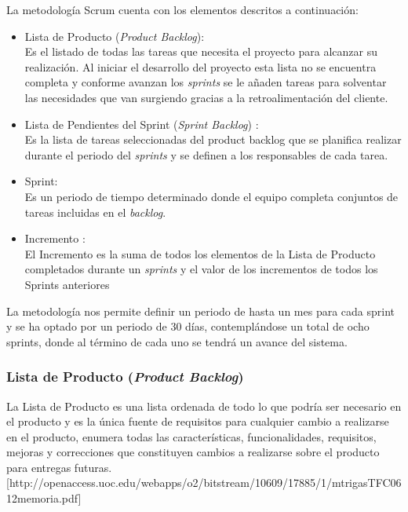 \noindent La metodología Scrum cuenta con los elementos descritos a continuación: 

\begin{itemize}
	\item Lista de Producto (\textit{Product Backlog}):\\
	Es el listado de todas las tareas que necesita el proyecto para alcanzar su realización. Al iniciar el desarrollo del
	proyecto esta lista no se encuentra completa y conforme avanzan los \textit{sprints} se le añaden tareas para solventar las necesidades que	van surgiendo gracias a la retroalimentación del cliente.
	\item Lista de Pendientes del Sprint (\textit{Sprint Backlog}) : \\
	Es la lista de tareas seleccionadas del product backlog que se planifica realizar durante el periodo del \textit{sprints} y se definen a los responsables de cada tarea.
	\item Sprint:\\
	Es un periodo de tiempo determinado donde el equipo completa conjuntos de tareas incluidas en el \textit{backlog}.
	\item Incremento : \\
	El Incremento es la suma de todos los elementos de la Lista de Producto completados durante un \textit{sprints} y el valor de los incrementos de todos los Sprints anteriores
\end{itemize}

La metodología nos permite definir un periodo de hasta un mes para cada sprint y se ha optado por un periodo de 30 días,
contemplándose un total de ocho sprints, donde al término de cada uno se tendrá un avance del sistema. 

\subsubsection{Lista de Producto (\textit{Product Backlog})}
La Lista de Producto es una lista ordenada de todo lo que podría ser necesario en el producto y es la única fuente de requisitos para cualquier cambio a realizarse en el producto, enumera todas las características, funcionalidades, requisitos, mejoras y correcciones que constituyen cambios a realizarse sobre el producto para entregas futuras.[http://openaccess.uoc.edu/webapps/o2/bitstream/10609/17885/1/mtrigasTFC0612memoria.pdf]

